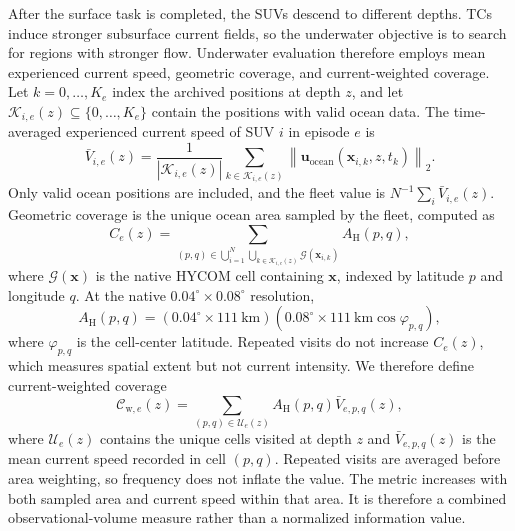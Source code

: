 \documentclass[a4paper,fleqn]{cas-dc}
\begin{document}
After the surface task is completed, the SUVs descend to different depths. TCs
induce stronger subsurface current fields, so the underwater objective is to
search for regions with stronger flow. Underwater evaluation therefore employs
mean experienced current speed, geometric coverage, and current-weighted
coverage. Let \(k=0,\ldots,K_e\) index the archived positions at depth \(z\),
and let
\(\mathcal{K}_{i,e}(z)\subseteq\{0,\ldots,K_e\}\) contain the positions with
valid ocean data. The time-averaged experienced current speed of SUV \(i\) in
episode \(e\) is
\begin{equation}
\bar V_{i,e}(z)=
\frac{1}{|\mathcal{K}_{i,e}(z)|}
\sum_{k\in\mathcal{K}_{i,e}(z)}
\left\|\mathbf{u}_{\mathrm{ocean}}
(\mathbf{x}_{i,k},z,t_k)\right\|_2.
\label{eq:experienced_current}
\end{equation}
Only valid ocean positions are included, and the fleet value is
\(N^{-1}\sum_i\bar V_{i,e}(z)\). Geometric coverage is the unique ocean area
sampled by the fleet, computed as
\begin{equation}
C_e(z)=
\sum_{(p,q)\in
\bigcup_{i=1}^{N}\bigcup_{k\in\mathcal{K}_{i,e}(z)}
\mathcal{G}(\mathbf{x}_{i,k})}
A_{\mathrm{H}}(p,q),
\label{eq:underwater_coverage}
\end{equation}
where \(\mathcal{G}(\mathbf{x})\) is the native HYCOM cell containing
\(\mathbf{x}\), indexed by latitude \(p\) and longitude \(q\). At the native
\(0.04^\circ\times0.08^\circ\) resolution,
\begin{equation}
A_{\mathrm{H}}(p,q)=
\left(0.04^\circ\times111\ \mathrm{km}\right)
\left(0.08^\circ\times111\ \mathrm{km}
\cos\varphi_{p,q}\right),
\label{eq:hycom_cell_area}
\end{equation}
where \(\varphi_{p,q}\) is the cell-center latitude. Repeated visits do not
increase \(C_e(z)\), which measures spatial extent but not current intensity.
We therefore define current-weighted coverage
\begin{equation}
\mathcal{C}_{\mathrm{w},e}(z)=
\sum_{(p,q)\in\mathcal{U}_e(z)}
A_{\mathrm{H}}(p,q)\bar V_{e,p,q}(z),
\label{eq:current_weighted_coverage}
\end{equation}
where \(\mathcal{U}_e(z)\) contains the unique cells visited at depth \(z\)
and \(\bar V_{e,p,q}(z)\) is the mean current speed recorded in cell
\((p,q)\). Repeated visits are averaged before area weighting, so frequency
does not inflate the value. The metric increases with both sampled area and
current speed within that area. It is therefore a combined observational-volume
measure rather than a normalized information value.
\end{document}
